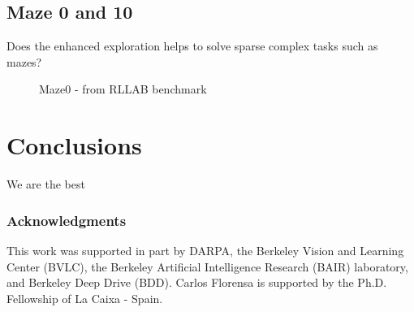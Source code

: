 \documentclass{article} %
\begin{document}
\subsection{Maze 0 and 10}
Does the enhanced exploration helps to solve sparse complex tasks such as mazes?



\begin{figure}[h!]
	\centering
	\caption{Maze0 - from RLLAB benchmark}
	\label{fig:hierarchized-exploration}
\end{figure}

\section{Conclusions}
We are the best

\subsubsection*{Acknowledgments}
This work was supported in part by DARPA, the Berkeley Vision and Learning Center (BVLC), the Berkeley Artificial Intelligence Research (BAIR) laboratory, and Berkeley Deep Drive (BDD). Carlos Florensa is supported by the Ph.D. Fellowship of La Caixa - Spain.
\end{document}
